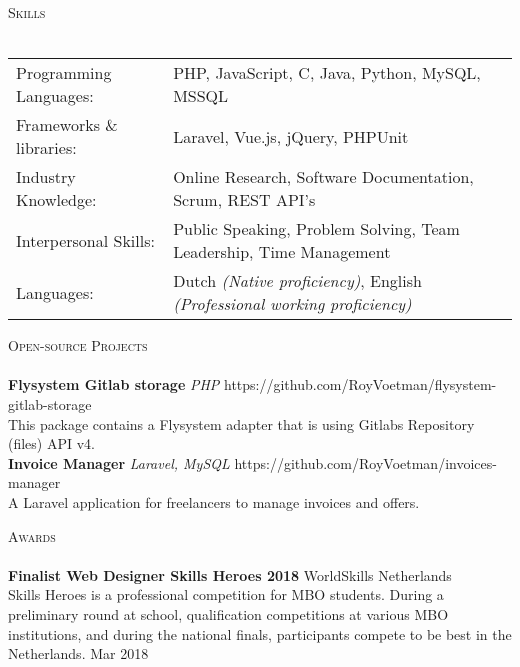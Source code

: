 \documentclass[a4paper]{article}
\newcommand{\lineunder} {
    \vspace*{-8pt} \\
    \hspace*{-18pt} \hrulefill \\
}
\newcommand{\header} [1] {
    {\hspace*{-18pt}\vspace*{6pt} \textsc{#1}}
    \vspace*{-6pt} \lineunder
}
\begin{document}
\header{Skills}
\begin{tabular}{ l l }
	Programming Languages:   & PHP, JavaScript, C, Java, Python, MySQL, MSSQL                     \\
    Frameworks \& libraries: & Laravel, Vue.js, jQuery, PHPUnit                                   \\
	Industry Knowledge:      & Online Research, Software Documentation, Scrum, REST API's         \\
	Interpersonal Skills:    & Public Speaking, Problem Solving, Team Leadership, Time Management \\
    Languages:               & Dutch \emph{(Native proficiency)}, English \emph{(Professional working proficiency)}\\
\end{tabular}
\vspace{2mm}

\header{Open-source Projects}
{\textbf{Flysystem Gitlab storage}} {\sl PHP} \hfill https://github.com/RoyVoetman/flysystem-gitlab-storage\\
This package contains a Flysystem adapter that is using Gitlab\textquotesingle{}s Repository (files) API v4.\\
\vspace*{2mm}
{\textbf{Invoice Manager}} {\sl Laravel, MySQL} \hfill https://github.com/RoyVoetman/invoices-manager\\
A Laravel application for freelancers to manage invoices and offers.\\
\vspace*{2mm}

\header{Awards}
\textbf{Finalist Web Designer Skills Heroes 2018} \hfill WorldSkills Netherlands\\
Skills Heroes is a professional competition for MBO students. During a preliminary round at school, qualification competitions at various MBO institutions, and during the national finals, participants compete to be best in the Netherlands. \hfill Mar 2018\\
\vspace*{2mm}

\ 
\end{document}
